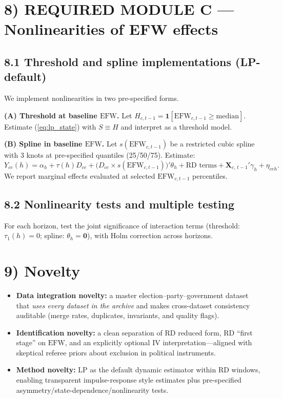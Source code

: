 \documentclass[11pt]{article}
\newcommand{\EFW}{\mathrm{EFW}}
\newcommand{\IV}{\mathrm{IV}}
\newcommand{\bX}{\mathbf{X}}
\newcommand{\1}{\mathbf{1}}
\newcommand{\cid}{c}
\newcommand{\eid}{e}
\begin{document}
\section*{8) REQUIRED MODULE C --- Nonlinearities of EFW effects}

\subsection*{8.1 Threshold and spline implementations (LP-default)}
We implement nonlinearities in two pre-specified forms.

\textbf{(A) Threshold at baseline $\EFW$.} Let $H_{\cid,t-1}=\1[\EFW_{\cid,t-1}\ge \mathrm{median}]$. Estimate (\ref{eq:lp_state}) with $S\equiv H$ and interpret as a threshold model.

\textbf{(B) Spline in baseline $\EFW$.} Let $s(\EFW_{\cid,t-1})$ be a restricted cubic spline with 3 knots at pre-specified quantiles (25/50/75). Estimate:
\begin{equation}
Y_{\cid \eid}(h)=\alpha_h+\tau(h)D_{\cid \eid}+\big(D_{\cid \eid}\times s(\EFW_{\cid,t-1})\big)'\theta_h + \text{RD terms} + \bX_{\cid,\,t-1}'\gamma_h+\eta_{\cid \eid h}.
\label{eq:lp_spline}
\end{equation}
We report marginal effects evaluated at selected $\EFW_{\cid,t-1}$ percentiles.

\subsection*{8.2 Nonlinearity tests and multiple testing}
For each horizon, test the joint significance of interaction terms (threshold: $\tau_1(h)=0$; spline: $\theta_h=\mathbf{0}$), with Holm correction across horizons.

\section*{9) Novelty}

\begin{itemize}[leftmargin=1.2em]
\item \textbf{Data integration novelty:} a master election--party--government dataset that \emph{uses every dataset in the archive} and makes cross-dataset consistency auditable (merge rates, duplicates, invariants, and quality flags).
\item \textbf{Identification novelty:} a clean separation of RD reduced form, RD ``first stage'' on $\EFW$, and an explicitly optional $\IV$ interpretation---aligned with skeptical referee priors about exclusion in political instruments.
\item \textbf{Method novelty:} LP as the default dynamic estimator within RD windows, enabling transparent impulse-response style estimates plus pre-specified asymmetry/state-dependence/nonlinearity tests.
\end{itemize}
\end{document}
